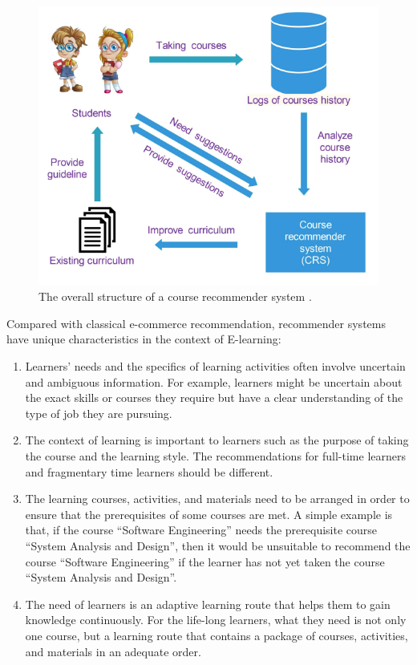 \begin{figure}[h]
    \centering
    \includegraphics[width=0.8\linewidth]{figures/crs.PNG} 
    \caption{The overall structure of a course recommender system \cite{wang2017sequence}.}
    \label{fig:myimage}
\end{figure}

Compared with classical e-commerce recommendation,
recommender systems have unique characteristics in the context of E-learning:
\begin{enumerate}
    \item Learners' needs and the specifics of learning activities often involve uncertain and ambiguous information. For example, learners might be uncertain about the exact skills or courses they require but have a clear understanding of the type of job they are pursuing. 
    \item The context of learning is important to learners such as the purpose of taking the course and the learning style. The recommendations for full-time learners and fragmentary time learners should be different.
    \item The learning courses, activities, and materials need to be arranged in order to ensure that the prerequisites of some courses are met. A simple example is that, if the course “Software Engineering” needs the prerequisite course “System Analysis and Design”, then it would be unsuitable to recommend the course “Software Engineering” if the learner has not yet taken the course “System Analysis and Design”. 
    \item The need of learners is an adaptive learning route that helps them to gain knowledge continuously. For the life-long learners, what they need is not only one course, but a learning route that contains a package of courses, activities, and materials in an adequate order.
\end{enumerate}
    
